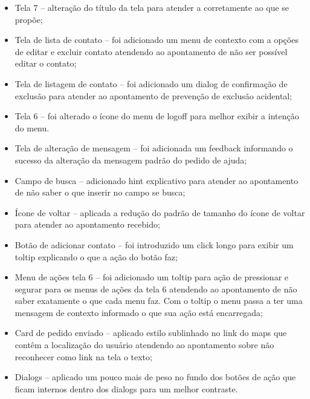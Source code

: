 \begin{itemize}
	\item Tela 7 – alteração do título da tela para atender a corretamente ao que se propõe;
	\item Tela de lista de contato – foi adicionado um menu de contexto com a opções de editar e excluir contato atendendo ao apontamento de não ser possível editar o contato;
	\item Tela de listagem de contato – foi adicionado um dialog de confirmação de exclusão para atender ao apontamento de prevenção de exclusão acidental;
	\item Tela 6 – foi alterado o ícone do menu de logoff para melhor exibir a intenção do menu.
	\item Tela de alteração de mensagem – foi adicionada um feedback informando o sucesso da alteração da mensagem padrão do pedido de ajuda;
	\item Campo de busca – adicionado hint explicativo para atender ao apontamento de não saber o que inserir no campo se busca;
	\item Ícone de voltar – aplicada a redução do padrão de tamanho do ícone de voltar para atender ao apontamento recebido;
	\item Botão de adicionar contato – foi introduzido um click longo para exibir um toltip explicando o que a ação do botão faz;
	\item Menu de ações tela 6 – foi adicionado um toltip para ação de pressionar e segurar para os menus de ações da tela 6 atendendo ao apontamento de não saber exatamente o que cada menu faz. Com o toltip o menu passa a ter uma mensagem de contexto informado o que sua ação está encarregada;
	\item Card de pedido enviado – aplicado estilo sublinhado no link do maps que contêm a localização do usuário atendendo ao apontamento sobre não reconhecer como link na tela o texto;
	\item Dialogs – aplicado um pouco mais de peso no fundo dos botões de ação que ficam internos dentro dos dialogs para um melhor contraste.
	
\end{itemize}

